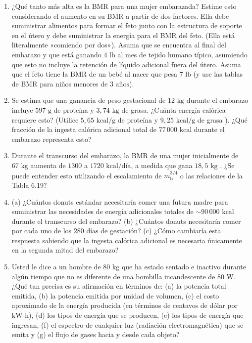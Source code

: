 \documentclass[12pt]{book}
\begin{document}
\begin{enumerate}
\item[6.52] ¿Qué tanto más alta es la BMR para una mujer embarazada? Estime esto considerando el aumento en su BMR a partir de dos factores. Ella debe suministrar alimentos para formar el feto junto con la estructura de soporte en el útero y debe suministrar la energía para el BMR del feto. (Ella está literalmente «comiendo por dos»). Asuma que se encuentra al final del embarazo y que está ganando $4\text{ lb}$ al mes de tejido humano típico, asumiendo que esto no incluye la retención de líquido adicional fuera del útero. Asuma que el feto tiene la BMR de un bebé al nacer que pesa $7\text{ lb}$ (y use las tablas de BMR para niños menores de $3\text{ años}$).

\item[6.53] Se estima que una ganancia de peso gestacional de $12\text{ kg}$ durante el embarazo incluye $597\text{ g}$ de proteína y $3{,}74\text{ kg}$ de grasa. ¿Cuánta energía calórica requiere esto? (Utilice $5{,}65\text{ kcal/g}$ de proteína y $9{,}25\text{ kcal/g}$ de grasa \cite{18}). ¿Qué fracción de la ingesta calórica adicional total de $77\,000\text{ kcal}$ durante el embarazo representa esto?

\item[6.54] Durante el transcurso del embarazo, la BMR de una mujer inicialmente de $67\text{ kg}$ aumenta de $1300$ a $1720\text{ kcal/día}$, a medida que gana $18{,}5\text{ kg}$ \cite{58}. ¿Se puede entender esto utilizando el escalamiento de $m_{\text{b}}^{3/4}$ o las relaciones de la Tabla 6.19?

\item[6.55] (a) ¿Cuántos donuts estándar necesitaría comer una futura madre para suministrar las necesidades de energía adicionales totales de $\sim 90\,000\text{ kcal}$ durante el transcurso del embarazo? (b) ¿Cuántos donuts necesitaría comer por cada uno de los $280\text{ días}$ de gestación? (c) ¿Cómo cambiaría esta respuesta sabiendo que la ingesta calórica adicional es necesaria únicamente en la segunda mitad del embarazo?

\item[6.56] Usted le dice a un hombre de $80\text{ kg}$ que ha estado sentado e inactivo durante algún tiempo que no es diferente de una bombilla incandescente de $80\text{ W}$. ¿Qué tan precisa es su afirmación en términos de: (a) la potencia total emitida, (b) la potencia emitida por unidad de volumen, (c) el costo aproximado de la energía producida (en términos de centavos de dólar por $\text{kW-h}$), (d) los tipos de energía que se producen, (e) los tipos de energía que ingresan, (f) el espectro de cualquier luz (radiación electromagnética) que se emita y (g) el flujo de gases hacia y desde cada objeto?


\end{enumerate}
\end{document}
